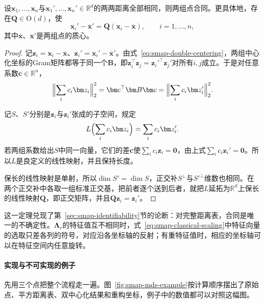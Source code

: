 \begin{theorem}[完整距离确定合同类]
\label{thm:smap-full-distance-congruence}
设$\bm x_1,\ldots,\bm x_n$与$\bm x_1',\ldots,\bm x_n'\in\mathbb R^d$的两两距离全部相同，则两组点合同。更具体地，存在$\bm Q\in\mathrm O(d)$，使
\begin{equation}
 \bm x_i'-\overline{\bm x}'=\bm Q(\bm x_i-\overline{\bm x}),\qquad i=1,\ldots,n ,
 \label{eq:smap-full-distance-congruence}
\end{equation}
其中$\overline{\bm x}$、$\overline{\bm x}'$是两组点的质心。
\end{theorem}
\begin{proof}
记$\bm z_i=\bm x_i-\overline{\bm x}$、$\bm z_i'=\bm x_i'-\overline{\bm x}'$。由式~\eqref{eq:smap-double-centering}，两组中心化坐标的Gram矩阵都等于同一个$\bm B$，即$\bm z_i^\top\bm z_j=\bm z_i'^\top\bm z_j'$对所有$i,j$成立。于是对任意系数$\bm c\in\mathbb R^n$，
\[
 \Bigl\lVert\sum_ic_i\bm z_i\Bigr\rVert_2^2=\bm c^\top\bm B\bm c=\Bigl\lVert\sum_ic_i\bm z_i'\Bigr\rVert_2^2 .
\]

记$S$、$S'$分别是$\bm z_i$与$\bm z_i'$张成的子空间，规定
\[
 L\Bigl(\sum_ic_i\bm z_i\Bigr)=\sum_ic_i\bm z_i' .
\]
若两组系数给出$S$中同一向量，它们的差$\bm c$使$\sum_ic_i\bm z_i=\bm0$，由上式$\sum_ic_i\bm z_i'=\bm0$。所以$L$是良定义的线性映射，并且保持长度。

保长的线性映射是单射，所以$\dim S'=\dim S$，正交补$S^\perp$与$S'^\perp$维数也相同。在两个正交补中各取一组标准正交基，把前者逐个送到后者，就把$L$延拓为$\mathbb R^d$上保长的线性映射$\bm Q$，即正交矩阵，并且$\bm Q\bm z_i=\bm z_i'$。
\end{proof}

这一定理兑现了第~\ref{sec:smap-identifiability}节的论断：对完整距离表，合同是唯一的不确定性。$\bm\Lambda_r$的特征值互不相同时，式~\eqref{eq:smap-classical-scaling}中特征向量的选取只差各列的符号，对应沿各坐标轴的反射；有重特征值时，相应的坐标轴可以在特征空间内任意旋转。

\paragraph{实现与不可实现的例子}

先用三个点把整个流程走一遍。图~\ref{fig:smap-mds-example}按计算顺序摆出了原始点、平方距离表、双中心化结果和重构坐标，例子中的数值都可以对照这幅图。

